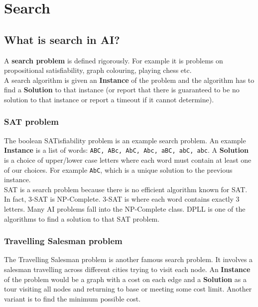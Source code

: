 \documentclass{article}
\newcommand{\n}[0]{\\[\baselineskip]}
\begin{document}
\section{Search}
\subsection{What is search in AI?}
A \textbf{search problem} is defined rigorously. For example it is problems on propositional satisfiability, graph colouring, playing chess etc.
\n
A search algorithm is given an \textbf{Instance} of the problem and the algorithm has to find a \textbf{Solution} to that instance (or report that there is guaranteed to be no solution to that instance or report a timeout if it cannot determine).

\subsubsection{SAT problem}
The boolean SATisfiability problem is an example search problem. An example \textbf{Instance} is a list of words: \texttt{ABC, ABc, AbC, Abc, aBC, abC, abc}. A \textbf{Solution} is a choice of upper/lower case letters where each word must contain at least one of our choices. For example \texttt{AbC}, which is a unique solution to the previous instance.
\n
SAT is a search problem because there is no efficient algorithm known for SAT. In fact, 3-SAT is NP-Complete. 3-SAT is where each word contains exactly 3 letters. Many AI problems fall into the NP-Complete class. DPLL is one of the algorithms to find a solution to that SAT problem. 

\subsubsection{Travelling Salesman problem}
The Travelling Salesman problem is another famous search problem. It involves a salesman travelling across different cities trying to visit each node. An \textbf{Instance} of the problem would be a graph with a cost on each edge and a \textbf{Solution} as a tour visiting all nodes and returning to base or meeting some cost limit. Another variant is to find the minimum possible cost. 
\end{document}
